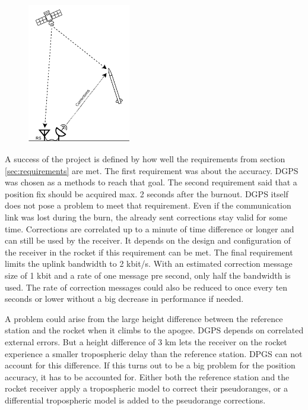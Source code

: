 \begin{figure}
  \centering
  \includegraphics[width=0.4\textwidth]{images/DGPS_Rocket_Concept.png}
  \label{fig:dgps_rocket_concept}
\end{figure}

A success of the project is defined by how well the requirements from section \ref{sec:requirements} are met.
The first requirement was about the accuracy.
DGPS was chosen as a methods to reach that goal.
The second requirement said that a position fix should be acquired max. 2 seconds after the burnout.
DGPS itself does not pose a problem to meet that requirement.
Even if the communication link was lost during the burn, the already sent corrections stay valid for some time.
Corrections are correlated up to a minute of time difference or longer and can still be used by the receiver.
It depends on the design and configuration of the receiver in the rocket if this requirement can be met.
The final requirement limits the uplink bandwidth to 2 kbit/s.
With an estimated correction message size of 1 kbit and a rate of one message pre second, only half the bandwidth is used.
The rate of correction messages could also be reduced to once every ten seconds or lower without a big decrease in performance if needed.

A problem could arise from the large height difference between the reference station and the rocket when it climbs to the apogee.
DGPS depends on correlated external errors.
But a height difference of 3 km lets the receiver on the rocket experience a smaller tropospheric delay than the reference station.
DPGS can not account for this difference.
If this turns out to be a big problem for the position accuracy, it has to be accounted for.
Either both the reference station and the rocket receiver apply a tropospheric model to correct their pseudoranges, or a differential tropospheric model is added to the pseudorange corrections.